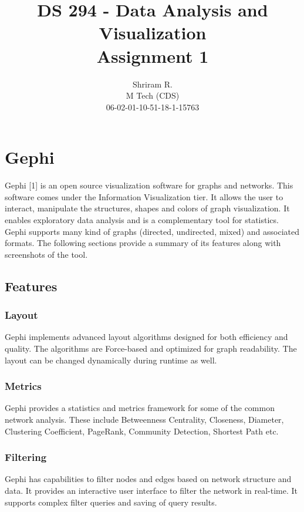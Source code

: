 \documentclass[11pt,a4paper,oneside]{article}
\begin{document}
	\title{DS 294 - Data Analysis and Visualization \\ Assignment 1}
	\author{Shriram R. \\ M Tech (CDS) \\ 06-02-01-10-51-18-1-15763}
	\maketitle	
	
	\section{Gephi}
	Gephi [1] is an open source visualization software for graphs and networks. This software comes under the Information Visualization tier. It allows the user to interact, manipulate the structures, shapes and colors of graph visualization. It enables exploratory data analysis and is a complementary tool for statistics. Gephi supports many kind of graphs (directed, undirected, mixed) and associated formats. The following sections provide a summary of its features along with screenshots of the tool.
	
	\subsection{Features}
	
	\subsubsection{Layout}
	Gephi implements advanced layout algorithms designed for both efficiency and quality. The algorithms are Force-based and optimized for graph readability. The layout can be changed dynamically during runtime as well.
	
	\subsubsection{Metrics}
	Gephi provides a statistics and metrics framework for some of the common network analysis. These include Betweenness Centrality, Closeness, Diameter, Clustering Coefficient, PageRank, Community Detection, Shortest Path etc.
	
	\subsubsection{Filtering}
	Gephi has capabilities to filter nodes and edges based on network structure and data. It provides an interactive user interface to filter the network in real-time. It supports complex filter queries and saving of query results.
	
\end{document}
